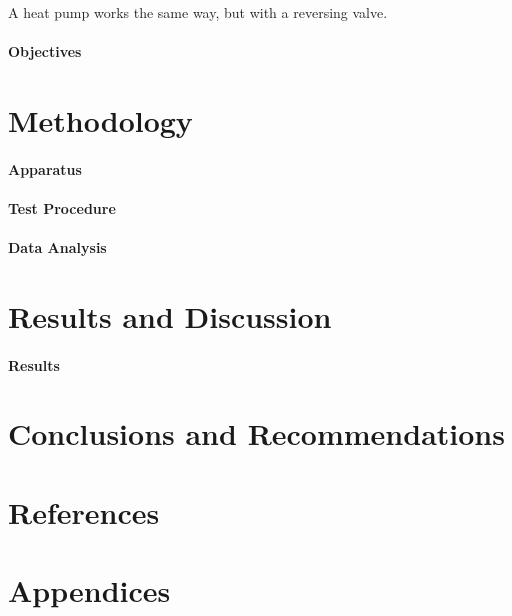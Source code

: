 \documentclass{article}
\begin{document}
	A heat pump works the same way, but with a reversing valve. 
	
	
\paragraph{Objectives}

\section{Methodology}
\paragraph {Apparatus}
\paragraph{Test Procedure}
\paragraph{Data Analysis}


\section{Results and Discussion}\label{conclusions}
\paragraph {Results} 

\section {Conclusions and Recommendations}


\section {References}


\section {Appendices}
\end{document}
